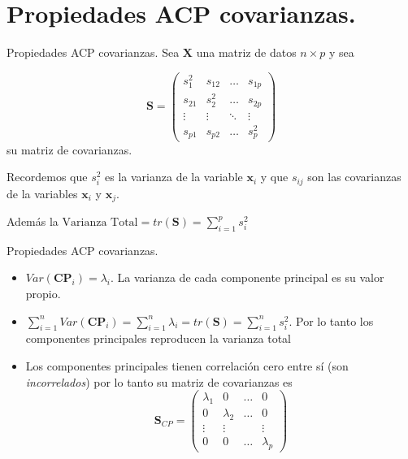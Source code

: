 \documentclass[
  ignorenonframetext,
]{beamer}
\providecommand{\tightlist}{%
  \setlength{\itemsep}{0pt}\setlength{\parskip}{0pt}}
\begin{document}
\section{Propiedades ACP
covarianzas.}\label{propiedades-acp-covarianzas.}

\begin{frame}{Propiedades ACP covarianzas.}
\label{propiedades-acp-covarianzas.-1}
Sea \(\mathbf{X}\) una matriz de datos \(n\times p\) y sea

\[
\mathbf{S}=\begin{pmatrix}
s_1^2& s_{ 1 2}&\ldots &s_{1 p}\\
s_{2 1}& s_{2}^2&\ldots &s_{2 p}\\
\vdots & \vdots &\ddots & \vdots\\
s_{p 1}& s_{ p 2}&\ldots &s_{p}^2
\end{pmatrix}
\] su matriz de covarianzas.

Recordemos que \(s_i^2\) es la varianza de la variable \(\mathbf{x}_i\)
y que \(s_{i j}\) son las covarianzas de la variables \(\mathbf{x}_i\) y
\(\mathbf{x}_j\).

Además la \(\mbox{Varianza Total}= tr(\mathbf{S})=\sum_{i=1}^p s_i^2\)
\end{frame}

\begin{frame}{Propiedades ACP covarianzas.}
\label{propiedades-acp-covarianzas.-2}
\begin{itemize}
\tightlist
\item
  \(Var(\mathbf{CP}_i)= \lambda_i\). La varianza de cada componente
  principal es su valor propio.
\item
  \(\sum_{i=1}^n Var(\mathbf{CP}_i)=\sum_{i=1}^n
  \lambda_i=tr(\mathbf{S})=\sum_{i=1}^n s_i^2\). Por lo tanto los
  componentes principales reproducen la varianza total
\item
  Los componentes principales tienen correlación cero entre sí (son
  \emph{incorrelados}) por lo tanto su matriz de covarianzas es
  \[\mathbf{S}_{CP}=\left(\begin{array}{cccc}
  \lambda_1& 0 &\ldots &0\\
  0& \lambda_{2}&\ldots & 0\\
  \vdots & \vdots & & \vdots\\
  0 & 0&\ldots &\lambda_{p}
  \end{array}
  \right)\]
\end{itemize}
\end{frame}
\end{document}
